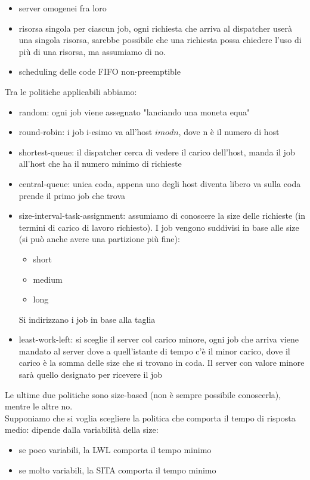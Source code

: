 \documentclass{article}
\begin{document}
\begin{itemize}
\item server omogenei fra loro
\item risorsa singola per ciascun job, ogni richiesta che arriva al dispatcher userà una singola risorsa, sarebbe possibile che una richiesta possa chiedere l'uso di più di una risorsa, ma assumiamo di no.
\item scheduling delle code FIFO non-preemptible
\end{itemize}
Tra le politiche applicabili abbiamo:
\begin{itemize}
\item random: ogni job viene assegnato "lanciando una moneta equa"
\item round-robin: i job i-esimo va all'host $imodn$, dove n è il numero di host
\item shortest-queue: il dispatcher cerca di vedere il carico dell'host, manda il job all'host che ha il numero minimo di richieste
\item central-queue: unica coda, appena uno degli host diventa libero va sulla coda prende il primo job che trova
\item size-interval-task-assignment: assumiamo di conoscere la size delle richieste (in termini di carico di lavoro richiesto). I job vengono suddivisi in base alle size (si può anche avere una partizione più fine):
\begin{itemize}
\item short
\item medium
\item long
\end{itemize}
Si indirizzano i job in base alla taglia
\item least-work-left: si sceglie il server col carico minore, ogni job che arriva viene mandato al server dove a quell'istante di tempo c'è il minor carico, dove il carico è la somma delle size che si trovano in coda. Il server con valore minore sarà quello designato per ricevere il job
\end{itemize}
Le ultime due politiche sono size-based (non è sempre possibile conoscerla), mentre le altre no.\\ Supponiamo che si voglia scegliere la politica che comporta il tempo di risposta medio: dipende dalla variabilità della size:
\begin{itemize}
\item se poco variabili, la LWL comporta il tempo minimo
\item se molto variabili, la SITA comporta il tempo minimo
\end{itemize}
\end{document}

